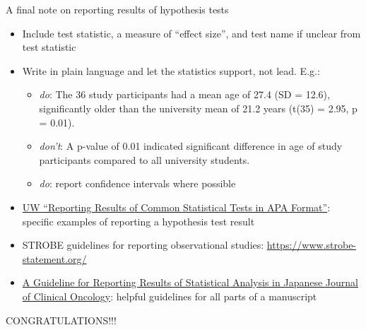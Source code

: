 \documentclass[
  ignorenonframetext,
]{beamer}
\providecommand{\tightlist}{%
  \setlength{\itemsep}{0pt}\setlength{\parskip}{0pt}}
\begin{document}
\begin{frame}{A final note on reporting results of hypothesis tests}
\protect\hypertarget{a-final-note-on-reporting-results-of-hypothesis-tests}{}

\begin{itemize}
\tightlist
\item
  Include test statistic, a measure of ``effect size'', and test name if
  unclear from test statistic
\item
  Write in plain language and let the statistics support, not lead.
  E.g.:

  \begin{itemize}
  \tightlist
  \item
    \emph{do}: The 36 study participants had a mean age of 27.4 (SD =
    12.6), significantly older than the university mean of 21.2 years
    (t(35) = 2.95, p = 0.01).
  \item
    \emph{don't}: A p-value of 0.01 indicated significant difference in
    age of study participants compared to all university students.
  \item
    \emph{do}: report confidence intervals where possible
  \end{itemize}
\end{itemize}

\tiny

\begin{itemize}
\tightlist
\item
  \href{https://psych.uw.edu/storage/writing_center/stats.pdf}{UW
  ``Reporting Results of Common Statistical Tests in APA Format''}:
  specific examples of reporting a hypothesis test result
\item
  STROBE guidelines for reporting observational studies:
  \url{https://www.strobe-statement.org/}
\item
  \href{https://academic.oup.com/DocumentLibrary/JJCO/eng.guideline.pdf}{A
  Guideline for Reporting Results of Statistical Analysis in Japanese
  Journal of Clinical Oncology}: helpful guidelines for all parts of a
  manuscript
\end{itemize}

\end{frame}

\begin{frame}{CONGRATULATIONS!!!}
\protect\hypertarget{congratulations}{}

\end{frame}
\end{document}
